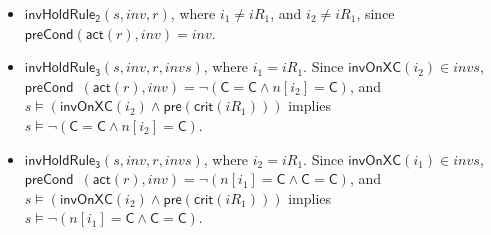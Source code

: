 \documentclass[final]{IEEEtran}
\def \eqc {=}
\def \andc {\wedge }
\def \negc {\lnot}
\begin{document}
\begin{example}
\begin{itemize}


\item     $\mathsf{invHoldRule_2 }(s,inv,r)$, where   $i_1 \neq iR_1$, and $i_2 \neq iR_1$, since $\mathsf{preCond}(\mathsf{act}(r),inv)=inv$.


 \item   $\mathsf{invHoldRule_3 }(s,inv,r,invs)$, where  $i_1 = iR_1$.
  Since
 $\mathsf{invOnXC}( i_2) \in invs$, $\mathsf{preCond}$\ $(\mathsf{act}(r),inv)=\negc (\mathsf{C}\eqc\mathsf{C}\andc n[i_2]\eqc\mathsf{C})$, and $s \models (\mathsf{invOnXC}( i_2) \andc \mathsf{pre}(\mathsf{crit}(iR_1)))$ implies  $s \models \negc (\mathsf{C}\eqc\mathsf{C}\andc n[i_2]\eqc\mathsf{C})$.


\item   $\mathsf{invHoldRule_3 }(s,inv,r,invs)$, where $i_2 = iR_1$.  Since
 $\mathsf{invOnXC}( i_1) \in invs$, $\mathsf{preCond}$\ $(\mathsf{act}(r),inv)=\negc (n[i_1]\eqc\mathsf{C}\andc \mathsf{C}\eqc\mathsf{C})$, and $s \models (\mathsf{invOnXC}( i_2) \andc \mathsf{pre}(\mathsf{crit}(iR_1)))$ implies  $s \models \negc ( n[i_1]\eqc\mathsf{C}\andc \mathsf{C}\eqc\mathsf{C})$. %
 \end{itemize}
\end{example}
\end{document}
